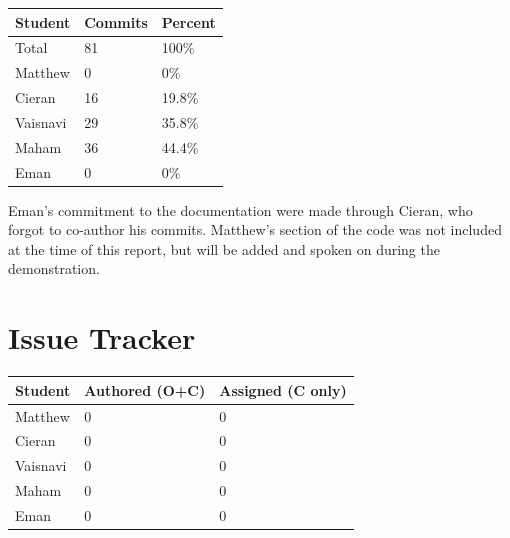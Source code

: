 \documentclass{article}
\begin{document}

\begin{table}[H]
\centering
\begin{tabular}{lll}
\toprule
\textbf{Student} & \textbf{Commits} & \textbf{Percent}\\
\midrule
Total & 81 & 100\% \\
Matthew & 0 & 0\% \\
Cieran & 16 & 19.8\% \\
Vaisnavi & 29 & 35.8\% \\
Maham & 36 & 44.4\% \\
Eman & 0 & 0\% \\
\bottomrule
\end{tabular}
\end{table}


Eman's commitment to the documentation were made through Cieran, who forgot to co-author his commits. Matthew's section of the code was not included at the time of this report, but will be added and spoken on during the demonstration.

\section{Issue Tracker}


\begin{table}[H]
\centering
\begin{tabular}{lll}
\toprule
\textbf{Student} & \textbf{Authored (O+C)} & \textbf{Assigned (C only)}\\
\midrule
Matthew & 0 & 0 \\
Cieran & 0 & 0 \\
Vaisnavi & 0 & 0 \\
Maham & 0 & 0 \\
Eman & 0 & 0 \\
\bottomrule
\end{tabular}
\end{table}
\end{document}
